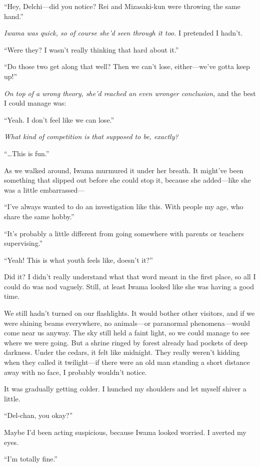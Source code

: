 \documentclass[
    a4paper,
    12pt,
    twoside,
    openany,
    UTF8,
    fontset=windows
]{ctexbook}
\begin{document}
``Hey, Delchi---did you notice? Rei and Mizasaki-kun were throwing the same hand.''

\textit{Iwama was quick, so of course she'd seen through it too.} I pretended I hadn't.

``Were they? I wasn't really thinking that hard about it.''

``Do those two get along that well? Then we can't lose, either---we've gotta keep up!''

\textit{On top of a wrong theory, she'd reached an even wronger conclusion,} and the best I could manage was:

``Yeah. I don't feel like we can lose.''

\textit{What kind of competition is that supposed to be, exactly?}

``\dots This is fun.''

As we walked around, Iwama murmured it under her breath. It might've been something that slipped out before she could stop it, because she added---like she was a little embarrassed---

``I've always wanted to do an investigation like this. With people my age, who share the same hobby.''

``It's probably a little different from going somewhere with parents or teachers supervising.''

“Yeah! This is what youth feels like, doesn’t it?”

Did it? I didn’t really understand what that word meant in the first place, so all I could do was nod vaguely. Still, at least Iwama looked like she was having a good time.

We still hadn’t turned on our flashlights. It would bother other visitors, and if we were shining beams everywhere, no animals—or paranormal phenomena—would come near us anyway. The sky still held a faint light, so we could manage to see where we were going. But a shrine ringed by forest already had pockets of deep darkness. Under the cedars, it felt like midnight. They really weren’t kidding when they called it twilight—if there were an old man standing a short distance away with no face, I probably wouldn’t notice.

It was gradually getting colder. I hunched my shoulders and let myself shiver a little.

“Del-chan, you okay?”

Maybe I’d been acting suspicious, because Iwama looked worried. I averted my eyes.

“I’m totally fine.”
\end{document}
